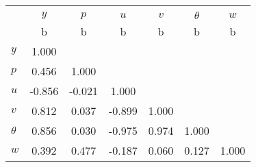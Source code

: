 \begin{tabular}{l*{6}{c}}
\toprule
                &\multicolumn{6}{c}{}                                       \\
                &    $ y $&    $ p $&    $ u $&    $ v $&$ \theta $&    $ w $\\
                &        b&        b&        b&        b&        b&        b\\
\midrule
$ y $           &    1.000&         &         &         &         &         \\
$ p $           &    0.456&    1.000&         &         &         &         \\
$ u $           &   -0.856&   -0.021&    1.000&         &         &         \\
$ v $           &    0.812&    0.037&   -0.899&    1.000&         &         \\
$ \theta $      &    0.856&    0.030&   -0.975&    0.974&    1.000&         \\
$ w $           &    0.392&    0.477&   -0.187&    0.060&    0.127&    1.000\\
\bottomrule
\end{tabular}
